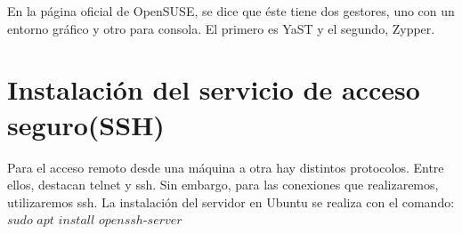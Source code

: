En la página oficial de OpenSUSE\cite{yast}, se dice que éste tiene dos gestores, uno con un entorno gráfico y otro para consola. El primero es YaST y el segundo, Zypper.

\newpage
\section{Instalación del servicio de acceso seguro(SSH)}
 
 Para el acceso remoto desde una máquina a otra hay distintos protocolos. Entre ellos, destacan telnet y ssh. Sin embargo, para las conexiones que realizaremos, utilizaremos ssh. La instalación del servidor en Ubuntu se realiza con el comando:\\
 
 $sudo$ $apt$ $install$ $openssh$-$server$\\
 
